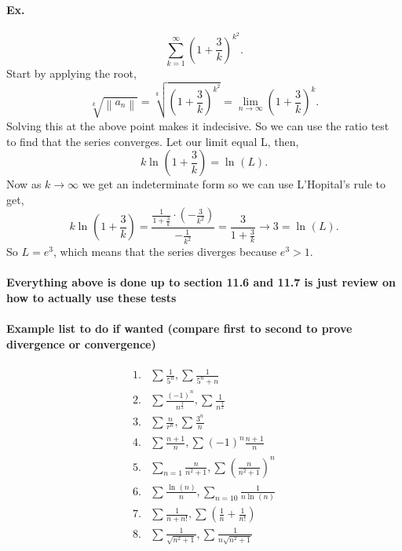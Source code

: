 \paragraph{Ex.}
\[
\sum_{ k=1 } ^{ \infty } \left( 1+\frac{ 3 }{ k }  \right) ^{ k^2 }
.\] 
Start by applying the root,
\[
\sqrt[ k ]{ \left\| a_n \right\| } = \sqrt[ k ]{ \left( 1+\frac{ 3 }{ k }  \right) ^{ k^2 } } = \lim_{ n \to \infty}  \left( 1+\frac{ 3 }{ k }  \right) ^{ k }
.\] 
Solving this at the above point makes it indecisive. So we can use the ratio test to find that the series converges. Let our limit equal L, then,
\[
k \ln^{  } \left( 1+\frac{ 3 }{ k }  \right) = \ln^{  } \left( L \right) 
.\] 
Now as $ k \to \infty $ we get an indeterminate form so we can use L'Hopital's rule to get,
\[
k\ln^{  } \left( 1+\frac{ 3 }{ k }  \right) = \frac{ \frac{ 1 }{ 1+\frac{ 3 }{ k }  }\cdot \left( -\frac{ 3 }{ k^2 }  \right)  }{ -\frac{ 1 }{ k^2 }  } = \frac{ 3 }{ 1+\frac{ 3 }{ k }  } \to 3 = \ln^{  } \left( L \right) 
.\] 
So $ L = e^{ 3 } $, which means that the series diverges because $ e^{ 3  }>1 $.
\paragraph{Everything above is done up to section 11.6 and 11.7 is just review on how to actually use these tests}

\paragraph{Example list to do if wanted (compare first to second to prove divergence or convergence)}
\begin{align*}
	1.& \sum_{  } ^{  } \frac{ 1 }{ 5^{ n } } , \sum_{  } ^{  } \frac{ 1 }{ 5^{ n }+n } \\
2.&\sum_{  } ^{  } \frac{ \left( -1 \right) ^{ n } }{ n^{ \frac{ 3 }{ 2 }  } }, \sum_{  } ^{  } \frac{ 1 }{ n^{ \frac{ 3 }{ 2 }  } } \\
3.&\sum_{  } ^{  } \frac{ n }{ r^{ n } } , \sum_{  } ^{  } \frac{ 3^{ n } }{ n } \\
4.&\sum_{  } ^{  } \frac{ n+1 }{ n }, \sum_{  } ^{  } \left( -1 \right) ^{ n } \frac{ n+1 }{ n } \\
5.&\sum_{ n=1 } ^{  } \frac{ n }{ n^2+1 } , \sum_{  } ^{  } \left( \frac{ n }{ n^2+1 }  \right) ^{ n } \\
6.&\sum_{  } ^{  } \frac{ \ln^{  } \left( n \right)  }{ n }, \sum_{ n=10 } ^{  } \frac{ 1 }{ n\ln^{  } \left( n \right)  } \\
7.&\sum_{  } ^{  } \frac{ 1 }{ n+n! } , \sum_{  } ^{  } \left( \frac{ 1 }{ n } +\frac{ 1 }{ n! }  \right) \\
8.&\sum_{  } ^{  } \frac{ 1 }{ \sqrt{ n^2+1} } , \sum_{ } ^{  } \frac{ 1 }{ n\sqrt{ n^2+1} } \\
\end{align*}
